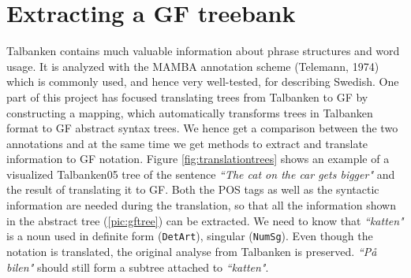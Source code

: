 \documentclass{report}
\begin{document}
\chapter{Extracting a GF treebank} %
\label{sec:Mapping}
Talbanken contains much valuable information about phrase structures and word 
usage. It is analyzed with the MAMBA annotation scheme (Telemann, 1974) which is 
commonly used, and hence very well-tested, for describing Swedish.
One part of this project has focused translating trees from Talbanken to GF
by constructing a mapping, which 
automatically transforms trees in Talbanken format to GF abstract syntax trees.
We hence get a comparison between the two annotations and at the same time
we get methods to extract and translate information to GF notation. 
Figure \ref{fig:translationtrees} shows an example of a visualized Talbanken05 tree
of the sentence \emph{``The cat on the car gets bigger"} and the result of translating it to GF.
Both the POS tags as well as the syntactic information are needed
during the translation, so that all the information shown in the abstract tree
(\ref{pic:gftree}) can be extracted. We need to know that \emph{``katten"} is a noun
used in definite form (\verb-DetArt-), singular (\verb-NumSg-). Even though the
notation is translated, the original analyse from Talbanken
is preserved.
\emph{``På bilen"} should still form a subtree attached to \emph{``katten"}.
\end{document}
